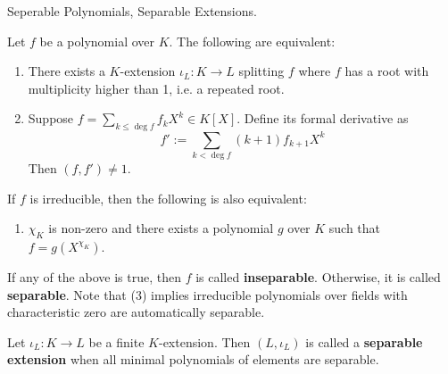 \documentclass[../book.tex]{subfiles}
\begin{document}
\begin{dfn} Seperable Polynomials, Separable Extensions.

    Let $f$ be a polynomial over $K$. 
    The following are equivalent: 
    \begin{enumerate}
        \item There exists a $K$-extension $\iota_L : K \to L$ splitting $f$ where
        $f$ has a root with multiplicity higher than 1, i.e. a repeated root.
        \item Suppose $f = \sum_{k \leq \deg f} f_k X^k \in K[X]$.
        Define its formal derivative as 
        \[ f' := \sum_{k < \deg f} (k+1)f_{k+1}X^k \]
        Then $(f,f') \neq 1$.
    \end{enumerate}
    If $f$ is irreducible, then the following is also equivalent: 
    \begin{enumerate} [resume]
        \item $\chi_K$ is non-zero and there exists a polynomial $g$ over $K$
        such that $f = g(X^{\chi_K})$.
    \end{enumerate}
    If any of the above is true, then $f$ is called \textbf{inseparable}.
    Otherwise, it is called \textbf{separable}.
    Note that (3) implies irreducible polynomials over fields with characteristic zero
    are automatically separable. 
    
    Let $\iota_L : K \to L$ be a finite $K$-extension.
    Then $(L,\iota_L)$ is called a \textbf{separable extension} when
    all minimal polynomials of elements are separable. 
\end{dfn}
\end{document}
